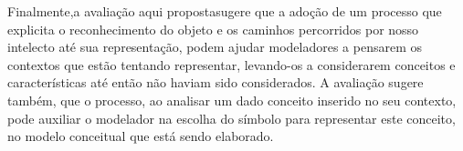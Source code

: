 Finalmente,a avaliação aqui propostasugere que a adoção de um processo que explicita o reconhecimento do objeto e os caminhos percorridos por nosso intelecto até sua representação, podem ajudar modeladores a pensarem os contextos que estão tentando representar, levando-os a considerarem conceitos e características até então não haviam sido considerados. A avaliação sugere também, que o processo, ao analisar um dado conceito inserido no seu contexto, pode auxiliar o modelador na escolha do símbolo para representar este conceito, no modelo conceitual que está sendo elaborado.